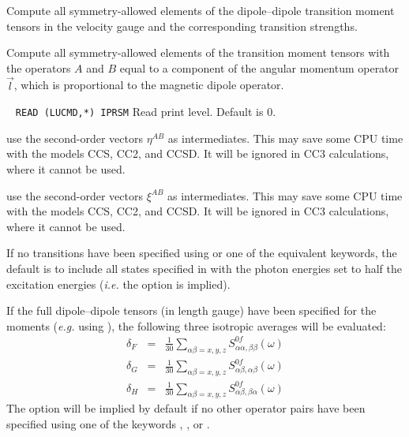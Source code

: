 \begin{description}
Compute all symmetry-allowed elements of the dipole--dipole 
transition moment tensors in the velocity gauge
and the corresponding transition strengths.
%
\item[\Key{ANGMOM}]
Compute all symmetry-allowed elements of 
the transition moment tensors
with the operators $A$ and $B$ equal to 
a component of the angular momentum operator $\vec{l}$,
which is proportional to the magnetic dipole operator.
%
\item[\Key{PRINT}] \verb| |\newline
\verb|READ (LUCMD,*) IPRSM|\newline
Read print level. Default is 0.
%
\item[\Key{USE X2}] use the second-order vectors $\eta^{AB}$ as intermediates.
   This may save some CPU time with the models CCS, CC2, and CCSD.
   It will be ignored in CC3 calculations, where it cannot be used. 
%
\item[\Key{USE O2}] use the second-order vectors $\xi^{AB}$ as intermediates.
   This may save some CPU time with the models CCS, CC2, and CCSD.
   It will be ignored in CC3 calculations, where it cannot be used. 
\end{description}
If no transitions have been specified using  or one
of the equivalent keywords, the default is to include all 
states specified in  with the photon energies
set to half the excitation energies 
({\it i.e.\/} the  option is implied).

If the full dipole--dipole tensors (in length gauge) have been specified for the
moments ({\it e.g.\/} using ), the following three isotropic averages will be
evaluated:
\begin{eqnarray*}
  \delta_F & = & \frac{1}{30} 
   \sum_{\alpha\beta=x,y,z} S^{0f}_{\alpha\alpha,\beta\beta}(\omega)
\\
  \delta_G & = & \frac{1}{30} 
   \sum_{\alpha\beta=x,y,z} S^{0f}_{\alpha\beta,\alpha\beta}(\omega)
\\
  \delta_H & = & \frac{1}{30} 
   \sum_{\alpha\beta=x,y,z} S^{0f}_{\alpha\beta,\beta\alpha}(\omega)
\end{eqnarray*}
The option  will be implied by default if no other
operator pairs have been specified using one of the keywords
, , or .

